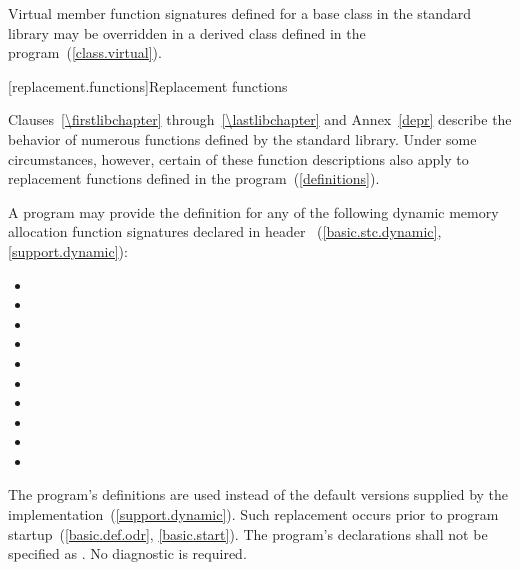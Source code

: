 \pnum
Virtual member function signatures defined
%
for a base class in the \Cpp standard
%
%
library may be overridden in a derived class defined in the program~(\ref{class.virtual}).

[replacement.functions]{Replacement functions}

\pnum
{}%
Clauses~\ref{\firstlibchapter} through~\ref{\lastlibchapter} and Annex~\ref{depr}
describe the behavior of numerous functions defined by
the \Cpp standard library.
Under some circumstances,
%
however, certain of these function descriptions also apply to replacement functions defined
in the program~(\ref{definitions}).

\pnum
A \Cpp program may provide the definition for any of the following
dynamic memory allocation function signatures declared in header
~(\ref{basic.stc.dynamic}, \ref{support.dynamic}):

\begin{itemize}
\item
{}%
%
\item
{}
\item
{}
\item
{}
\item
{}%
%
\item
{}
\item
{}
\item
{}
\item
{}
\item
{}
\end{itemize}

\pnum
The program's definitions are used instead of the default versions supplied by
the implementation~(\ref{support.dynamic}).
Such replacement occurs prior to program startup~(\ref{basic.def.odr}, \ref{basic.start}).
%
The program's declarations shall not be specified as
.
No diagnostic is required.

